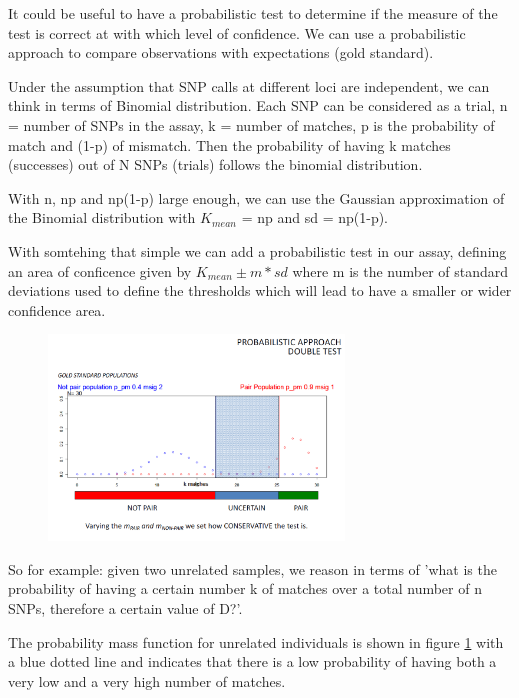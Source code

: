 It could be useful to have a probabilistic test to determine if the measure of the test is correct at with which level of confidence. We can use a probabilistic approach to compare observations with expectations (gold standard).

\bigskip
Under the assumption that SNP calls at different loci are independent, we can think in terms of Binomial distribution. Each SNP can be considered as a trial, n = number of SNPs in the assay, k = number of matches, p is the probability of match and (1-p) of mismatch. Then the probability of having k matches (successes) out of N SNPs (trials) follows the binomial distribution.

With n, np and np(1-p) large enough, we can use the Gaussian approximation of the Binomial distribution with $K_{mean}$ = np and sd = np(1-p). 

With somtehing that simple we can add a probabilistic test in our assay, defining an area of conficence given by $K_{mean} \pm m * sd$ where m is the number of standard deviations used to define the thresholds which will lead to have a smaller or wider confidence area. 

\begin{figure}
	\centering
	\includegraphics[width=0.7\textwidth]{Prob_test.PNG}
	\caption{\label{fig:prob_test}}
\end{figure}

\bigskip
So for example: given two unrelated samples, we reason in terms of 'what is the probability of having a certain number k of matches over a total number of n SNPs, therefore a certain value of D?'. 

The probability mass function for unrelated individuals is shown in figure \ref{fig:prob_test} with a blue dotted line and indicates that there is a low probability of having both a very low and a very high number of matches. 

